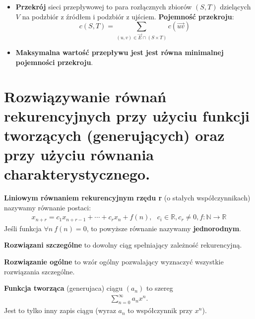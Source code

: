 \documentclass[main.tex]{subfiles}
\begin{document}
\begin{itemize}
        \item \textbf{Przekrój} sieci przepływowej to para rozłącznych zbiorów $(S, T)$ dzielących $V$ na podzbiór z
        źródłem i podzbiór z ujściem. \textbf{Pojemność przekroju}:
        \[c(S, T) = \sum_{(u,v) \in \vec{E} \cap (S \times T)} c(\vec{uv})\]

        \item \textbf{Maksymalna wartość przepływu jest jest równa minimalnej pojemności przekroju}.
    \end{itemize}


    \section{Rozwiązywanie równań rekurencyjnych przy użyciu funkcji tworzących (generujących) oraz przy użyciu
    równania charakterystycznego.}

    \begin{definition}
        \textbf{Liniowym równaniem rekurencyjnym rzędu r} (o stałych współczynnikach) nazywamy równanie postaci:
        \begin{align*}
            x_{n+r} = c_1 x_{n+r-1} +  \cdots + c_r x_n + f(n), ~~~ c_i  \in \mathbb{R}, c_r \neq 0, f:  \mathbb{N} \rightarrow \mathbb{R}
        \end{align*}
        Jeśli funkcja $\forall n ~ f(n) = 0$, to powyższe równanie nazywamy \textbf{jednorodnym}.

        \textbf{Rozwiązani szczególne} to dowolny ciąg spełniający zależność rekurencyjną.

        \textbf{Rozwiązanie ogólne} to wzór ogólny pozwalający wyznaczyć wszystkie rozwiązania szczególne.
    \end{definition}

    \begin{definition}
        \textbf{Funkcja tworząca} (generujaca) ciągu $(a_n)$ to szereg
        \begin{align*}
            \sum_{n=0}^{\infty} a_n x^n.
        \end{align*}
        Jest to tylko inny zapis ciągu (wyraz $a_n$ to współczynnik przy $x^n$).
    \end{definition}
\end{document}
